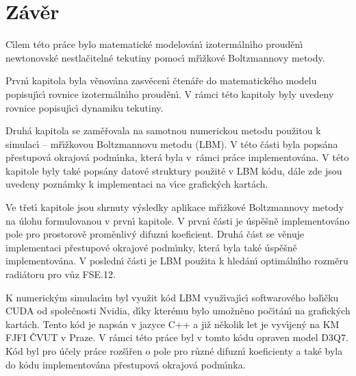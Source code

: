 \chapter*{Závěr}

\pagestyle{plain}


C\'{\i}lem t\'{e}to pr\'{a}ce bylo matematick\'{e} modelov\'{a}n\'{\i} izoterm\'{a}ln\'{\i}ho proud\v{e}n\'{\i} newtonovsk\'{e} nestla\v{c}iteln\'{e} tekutiny pomoc\'{\i} m\v{r}\'{\i}\v{z}kov\'{e} Boltzmannovy metody.

Prvn\'{\i} kapitola byla v\v{e}nov\'{a}na zasv\v{e}cen\'{\i} \v{c}ten\'{a}\v{r}e do matematick\'{e}ho modelu popisuj\'{\i}c\'{\i} rovnice izoterm\'{a}ln\'{\i}ho proud\v{e}n\'{\i}. V r\'{a}mci t\'{e}to kapitoly byly uvedeny rovnice popisuj\'{\i}c\'{\i} dynamiku tekutiny. 

Druh\'{a} kapitola se zam\v{e}\v{r}ovala na samotnou numerickou metodu pou\v{z}itou k simulac\'{\i} -- m\v{r}\'{\i}\v{z}kovou Boltzmannovu metodu (LBM). V t\'{e}to \v{c}\'{a}sti byla pops\'{a}na p\v{r}estupov\'{a} okrajov\'{a} podm\'{\i}nka, kter\'{a} byla v~r\'{a}mci pr\'{a}ce implementov\'{a}na. V t\'{e}to kapitole byly tak\'{e} pops\'{a}ny datov\'{e} struktury pou\v{z}it\'{e} v LBM k\'{o}du, d\'{a}le zde jsou uvedeny pozn\'{a}mky k implementaci na v\'{\i}ce grafick\'{y}ch kart\'{a}ch.  

Ve t\v{r}et\'{\i} kapitole jsou shrnuty v\'{y}sledky aplikace m\v{r}\'{\i}\v{z}kov\'{e} Boltzmannovy metody na \'{u}lohu formulovanou v prvn\'{\i} kapitole.  V prvn\'{\i} \v{c}\'{a}sti je \'{u}sp\v{e}\v{s}n\v{e} implementov\'{a}no pole pro prostorov\v{e} prom\v{e}nliv\'{y} difuzn\'{\i} koeficient. Druh\'{a} \v{c}\'{a}st se v\v{e}nuje implementaci p\v{r}estupov\'{e} okrajov\'{e} podm\'{\i}nky, kter\'{a} byla tak\'{e} \'{u}sp\v{e}\v{s}n\v{e} implementov\'{a}na. V posledn\'{\i} \v{c}\'{a}sti je LBM pou\v{z}ita k hled\'{a}n\'{\i} optim\'{a}ln\'{\i}ho rozm\v{e}ru radi\'{a}toru pro v\r{u}z FSE.12.

K numerick\'{y}m simulac\'{\i}m byl vyu\v{z}it k\'{o}d LBM vyu\v{z}\'{\i}vaj\'{\i}c\'{\i} softwarov\'{e}ho bal\'{\i}\v{c}ku CUDA od spole\v{c}nosti Nvidia, d\'{\i}ky kter\'{e}mu bylo umo\v{z}n\v{e}no po\v{c}\'{\i}t\'{a}n\'{\i} na grafick\'{y}ch kart\'{a}ch. Tento k\'{o}d je naps\'{a}n v jazyce C++ a ji\v{z} n\v{e}kolik let je vyv\'{\i}jen\'{y} na KM FJFI \v{C}VUT v Praze.  V r\'{a}mci t\'{e}to pr\'{a}ce byl v tomto k\'{o}du opraven model D3Q7. K\'{o}d byl pro \'{u}\v{c}ely pr\'{a}ce roz\v{s}\'{\i}\v{r}en o pole pro r\r{u}zn\'{e} difuzn\'{\i} koeficienty a tak\'{e} byla do k\'{o}du implementov\'{a}na p\v{r}estupov\'{a} okrajov\'{a} podm\'{\i}nka.

